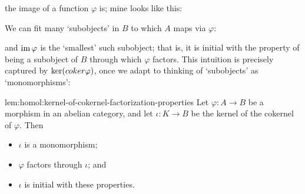 the image of a function $\varphi$ is; mine looks like this:
\begin{center}
\end{center}
We can fit many `subobjects' in $B$ to which $A$ maps via $\varphi$:
\begin{center}
\end{center}
and $\operatorname{im}\varphi$ is the `smallest' such subobject; that is, it is
initial with the property of being a subobject of $B$ through which
$\varphi$ factors. This intuition is precisely captured by
$\ker(coker\varphi)$, once we adapt to thinking of `subobjects' as
`monomorphisms':
\begin{lem}{}{lem:homol:kernel-of-cokernel-factorization-properties}
  Let $\varphi : A \to B$ be a morphism in an abelian category, and
  let $\iota : K \to B$ be the kernel of the cokernel of $\varphi$.
  Then
  \begin{itemize}
  \item $\iota$ is a monomorphism;
  \item $\varphi$ factors through $\iota$; and
  \item $\iota$ is initial with these properties.
  \end{itemize}
\end{lem}

